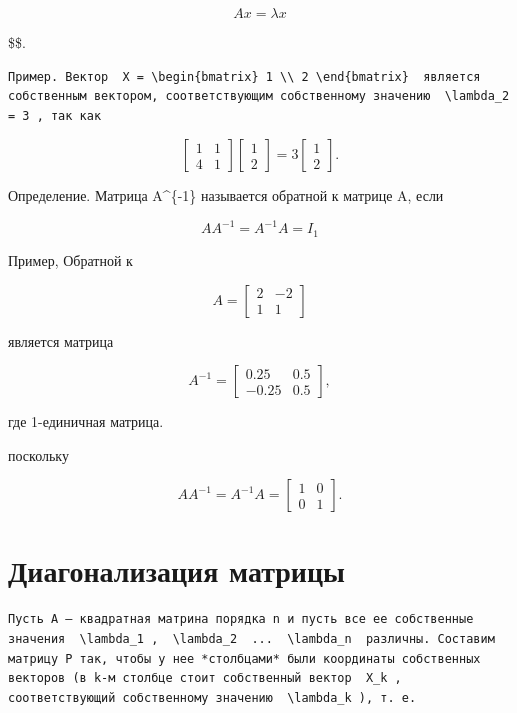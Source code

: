 \documentclass[
  ukrainian,
]{article}
\begin{document}
\[
Ax = \lambda x
\]

\$\$.

\begin{verbatim}
Пример. Вектор  X = \begin{bmatrix} 1 \\ 2 \end{bmatrix}  является собственным вектором, соответствующим собственному значению  \lambda_2 = 3 , так как
\end{verbatim}

\[
\begin{bmatrix} 1 & 1 \\ 4 & 1 \end{bmatrix} \begin{bmatrix} 1 \\ 2 \end{bmatrix} = 3 \begin{bmatrix} 1 \\ 2 \end{bmatrix}.
\]

Определение. Матрица A\^{}\{-1\} называется обратной к матрице A, если

\[
AA^{-1} = A^{-1}A = I_1
\]

Пример, Обратной к

\[
A = \begin{bmatrix} 2 & -2 \\ 1 & 1 \end{bmatrix}
\]

является матрица

\[
A^{-1} = \begin{bmatrix} 0.25 & 0.5 \\ -0.25 & 0.5 \end{bmatrix},
\]

где 1-единичная матрица.

поскольку

\[
AA^{-1} = A^{-1}A = \begin{bmatrix} 1 & 0 \\ 0 & 1 \end{bmatrix}.
\]

\section{Диагонализация
матрицы}\label{ux434ux438ux430ux433ux43eux43dux430ux43bux438ux437ux430ux446ux438ux44f-ux43cux430ux442ux440ux438ux446ux44b}

\begin{verbatim}
Пусть A — квадратная матрина порядка n и пусть все ее собственные значения  \lambda_1 ,  \lambda_2  ...  \lambda_n  различны. Составим матрицу P так, чтобы у нее *столбцами* были координаты собственных векторов (в k-м столбце стоит собственный вектор  X_k , соответствующий собственному значению  \lambda_k ), т. е.
\end{verbatim}
\end{document}
